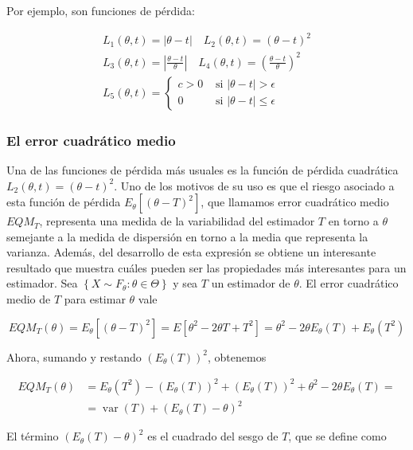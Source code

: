 \documentclass[
]{article}
\begin{document}
Por ejemplo, son funciones de pérdida:

\[
\begin{gathered}
L_{1}(\theta, t)=|\theta-t| \quad L_{2}(\theta, t)=(\theta-t)^{2} \\
L_{3}(\theta, t)=\left|\frac{\theta-t}{\theta}\right| \quad L_{4}(\theta, t)=\left(\frac{\theta-t}{\theta}\right)^{2} \\
L_{5}(\theta, t)= \begin{cases}c>0 & \text { si }|\theta-t|>\epsilon \\
0 & \text { si }|\theta-t| \leq \epsilon\end{cases}
\end{gathered}
\]

\subsubsection{El error cuadrático medio}\label{el-error-cuadruxe1tico-medio}

Una de las funciones de pérdida más usuales es la función de pérdida cuadrática \(L_{2}(\theta, t)=(\theta-t)^{2}\). Uno de los motivos de su uso es que el riesgo asociado a esta función de pérdida \(E_{\theta}\left[(\theta-T)^{2}\right]\), que llamamos error cuadrático medio \(E Q M_{T}\), representa una medida de la variabilidad del estimador \(T\) en torno a \(\theta\) semejante a la medida de dispersión en torno a la media que representa la varianza.
Además, del desarrollo de esta expresión se obtiene un interesante resultado que muestra cuáles pueden ser las propiedades más interesantes para un estimador.
Sea \(\left\{X \sim F_{\theta}: \theta \in \Theta\right\}\) y sea \(T\) un estimador de \(\theta\). El error cuadrático medio de \(T\) para estimar \(\theta\) vale

\[
E Q M_{T}(\theta)=E_{\theta}\left[(\theta-T)^{2}\right]=E\left[\theta^{2}-2 \theta T+T^{2}\right]=\theta^{2}-2 \theta E_{\theta}(T)+E_{\theta}\left(T^{2}\right)
\]

Ahora, sumando y restando \(\left(E_{\theta}(T)\right)^{2}\), obtenemos

\[
\begin{aligned}
E Q M_{T}(\theta) & =E_{\theta}\left(T^{2}\right)-\left(E_{\theta}(T)\right)^{2}+\left(E_{\theta}(T)\right)^{2}+\theta^{2}-2 \theta E_{\theta}(T)= \\
& =\operatorname{var}(T)+\left(E_{\theta}(T)-\theta\right)^{2}
\end{aligned}
\]

El término \(\left(E_{\theta}(T)-\theta\right)^{2}\) es el cuadrado del sesgo de \(T\), que se define como
\end{document}

